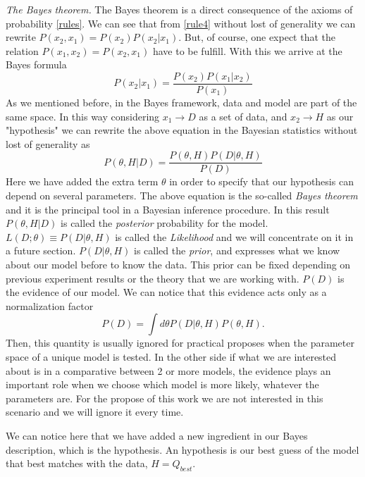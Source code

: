 \documentclass[onecolumn,           %
               showpacs,            %
               preprintnumbers,     %
               aps,                 %
               prl,          	    %
               letterpaper,             %
               superscriptaddress,      %
               nofootinbib,         %
               tightenlines,        %
               floats,floatfix      %
               ,usenatbib,
               ]{revtex4-1}
\begin{document}
\textit{The Bayes theorem.} The Bayes theorem is a direct consequence of the axioms of probability \eqref{rules}. We can see that from \eqref{rule4} without lost of generality we can rewrite $P(x_2,x_1)=P(x_2)P(x_2|x_1)$. But, of course, one expect that the relation $P(x_1,x_2)=P(x_2,x_1)$ have to be fulfill. With this we arrive at the Bayes formula   
\begin{equation}
P(x_2|x_1)=\frac{P(x_2)P(x_1|x_2)}{P(x_1)}
\end{equation}
As we mentioned before, in the Bayes framework, data and model are part of the same space. In this way considering $x_1\rightarrow D$ as a set of data, and $x_2\rightarrow H$ as our "hypothesis" we can rewrite the above equation in the Bayesian statistics without lost of generality as
\begin{equation}\label{BayesT}
P(\theta,H|D)=\frac{P(\theta,H)P(D|\theta,H)}{P(D)}
\end{equation}
Here we have added the extra term $\theta$ in order to specify that our hypothesis can depend on several parameters. 
The above equation is the so-called \textit{Bayes theorem} and it is the principal tool in a Bayesian inference procedure. In this result $P(\theta,H|D)$ is called the \textit{posterior} probability for the model. $L(D;\theta)\equiv P(D|\theta,H)$ is called the \textit{Likelihood} and we will concentrate on it in a future section. $P(D|\theta,H)$ is called the \textit{prior}, and expresses what we know about our model before to know the data. This prior can be fixed depending on previous experiment results or the theory that we are working with. $P(D)$ is the evidence of our model. We can notice that this evidence acts only as a normalization factor
\begin{equation}\label{PD}
P(D)=\int d\theta P(D|\theta,H)P(\theta,H).
\end{equation}
Then, this quantity is usually ignored for practical proposes when the parameter space of a unique model is tested. In the other side if what we are interested about is in a comparative between 2 or more models, the evidence plays an important role when we choose which model is more likely, whatever the parameters are. For the propose of this work we are not interested in this scenario and we will ignore it every time.

We can notice here that we have added a new ingredient in our Bayes description, which is the hypothesis. An hypothesis is our best guess of the model that best matches with the data, $H=Q_{best}$.
\end{document}
